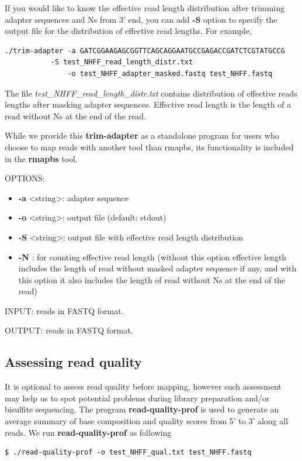 \documentclass{article}
\begin{document}
If you would like to know the effective read length distribution after trimming
adapter sequences and Ns from 3' end, you can add \textbf{-S} option
to specify the output file for the distribution of effective read lengths. For example,
\begin{verbatim}
./trim-adapter -a GATCGGAAGAGCGGTTCAGCAGGAATGCCGAGACCGATCTCGTATGCCG 
	       -S test_NHFF_read_length_distr.txt 
               -o test_NHFF_adapter_masked.fastq test_NHFF.fastq
\end{verbatim}
The file \textit{test\_NHFF\_read\_length\_distr.txt} contains distribution of effective reads
lengths after masking adapter sequences. Effective read length is the length of a read 
 without Ns at the end of the read.

While we provide this \textbf{trim-adapter} as a standalone program
for users who choose to map reads with another tool than rmapbs, its functionality is included
in the \textbf{rmapbs} tool.

OPTIONS:
\begin{itemize}
\item
\textbf{-a} \textless string\textgreater : adapter sequence
\item
\textbf{-o} \textless string\textgreater : output file (default: stdout) 
\item
\textbf{-S} \textless string\textgreater : output file with effective read length distribution
\item
\textbf{-N} : for counting effective read length (without this option effective length includes
the length of read without masked adapter sequence if any, and with this option it also includes
the length of read without Ns at the end of the read)
\end{itemize}

INPUT: reads in FASTQ format.

OUTPUT: reads in FASTQ format.

\subsection{Assessing read quality}
\label{sec:read-qual-assessm}
It is optional to assess read quality before mapping, however such
assessment may help us to spot potential problems during library
preparation and/or bisulfite sequencing. The program
\textbf{read-quality-prof} is used to generate an average summary of
base composition and quality scores from 5' to 3' along all
reads.  We run \textbf{read-quality-prof} as following 
\begin{verbatim}
$ ./read-quality-prof -o test_NHFF_qual.txt test_NHFF.fastq
\end{verbatim}
\end{document}
